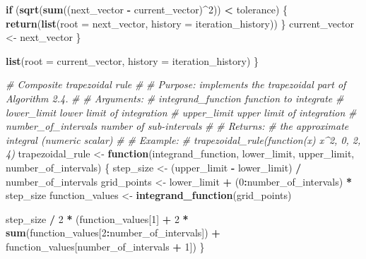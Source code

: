 \documentclass[
]{article}
\newenvironment{Shaded}{\begin{snugshade}}{\end{snugshade}}
\newcommand{\AttributeTok}[1]{\textcolor[rgb]{0.13,0.29,0.53}{#1}}
\newcommand{\CommentTok}[1]{\textcolor[rgb]{0.56,0.35,0.01}{\textit{#1}}}
\newcommand{\ControlFlowTok}[1]{\textcolor[rgb]{0.13,0.29,0.53}{\textbf{#1}}}
\newcommand{\DecValTok}[1]{\textcolor[rgb]{0.00,0.00,0.81}{#1}}
\newcommand{\FunctionTok}[1]{\textcolor[rgb]{0.13,0.29,0.53}{\textbf{#1}}}
\newcommand{\NormalTok}[1]{#1}
\newcommand{\OtherTok}[1]{\textcolor[rgb]{0.56,0.35,0.01}{#1}}
\newcommand{\SpecialCharTok}[1]{\textcolor[rgb]{0.81,0.36,0.00}{\textbf{#1}}}
\begin{document}
\begin{Shaded}
\begin{Highlighting}[]
    \ControlFlowTok{if}\NormalTok{ (}\FunctionTok{sqrt}\NormalTok{(}\FunctionTok{sum}\NormalTok{((next\_vector }\SpecialCharTok{{-}}\NormalTok{ current\_vector)}\SpecialCharTok{\^{}}\DecValTok{2}\NormalTok{)) }\SpecialCharTok{\textless{}}\NormalTok{ tolerance) \{}
      \FunctionTok{return}\NormalTok{(}\FunctionTok{list}\NormalTok{(}\AttributeTok{root =}\NormalTok{ next\_vector, }\AttributeTok{history =}\NormalTok{ iteration\_history))}
\NormalTok{    \}}
\NormalTok{    current\_vector }\OtherTok{\textless{}{-}}\NormalTok{ next\_vector}
\NormalTok{  \}}

  \FunctionTok{list}\NormalTok{(}\AttributeTok{root =}\NormalTok{ current\_vector, }\AttributeTok{history =}\NormalTok{ iteration\_history)}
\NormalTok{\}}

\CommentTok{\#\textquotesingle{} Composite trapezoidal rule}
\CommentTok{\#\textquotesingle{}}
\CommentTok{\#\textquotesingle{} Purpose: implements the trapezoidal part of Algorithm 2.4.}
\CommentTok{\#\textquotesingle{}}
\CommentTok{\#\textquotesingle{} Arguments:}
\CommentTok{\#\textquotesingle{}   integrand\_function   function to integrate}
\CommentTok{\#\textquotesingle{}   lower\_limit          lower limit of integration}
\CommentTok{\#\textquotesingle{}   upper\_limit          upper limit of integration}
\CommentTok{\#\textquotesingle{}   number\_of\_intervals  number of sub{-}intervals}
\CommentTok{\#\textquotesingle{}}
\CommentTok{\#\textquotesingle{} Returns:}
\CommentTok{\#\textquotesingle{}   the approximate integral (numeric scalar)}
\CommentTok{\#\textquotesingle{}}
\CommentTok{\#\textquotesingle{} Example:}
\CommentTok{\#\textquotesingle{}   trapezoidal\_rule(function(x) x\^{}2, 0, 2, 4)}
\NormalTok{trapezoidal\_rule }\OtherTok{\textless{}{-}} \ControlFlowTok{function}\NormalTok{(integrand\_function, lower\_limit, upper\_limit, number\_of\_intervals) \{}
\NormalTok{  step\_size }\OtherTok{\textless{}{-}}\NormalTok{ (upper\_limit }\SpecialCharTok{{-}}\NormalTok{ lower\_limit) }\SpecialCharTok{/}\NormalTok{ number\_of\_intervals}
\NormalTok{  grid\_points }\OtherTok{\textless{}{-}}\NormalTok{ lower\_limit }\SpecialCharTok{+}\NormalTok{ (}\DecValTok{0}\SpecialCharTok{:}\NormalTok{number\_of\_intervals) }\SpecialCharTok{*}\NormalTok{ step\_size}
\NormalTok{  function\_values }\OtherTok{\textless{}{-}} \FunctionTok{integrand\_function}\NormalTok{(grid\_points)}

\NormalTok{  step\_size }\SpecialCharTok{/} \DecValTok{2} \SpecialCharTok{*}\NormalTok{ (function\_values[}\DecValTok{1}\NormalTok{] }\SpecialCharTok{+} \DecValTok{2} \SpecialCharTok{*} \FunctionTok{sum}\NormalTok{(function\_values[}\DecValTok{2}\SpecialCharTok{:}\NormalTok{number\_of\_intervals]) }\SpecialCharTok{+}
\NormalTok{    function\_values[number\_of\_intervals }\SpecialCharTok{+} \DecValTok{1}\NormalTok{])}
\NormalTok{\}}


\end{Highlighting}
\end{Shaded}
\end{document}
